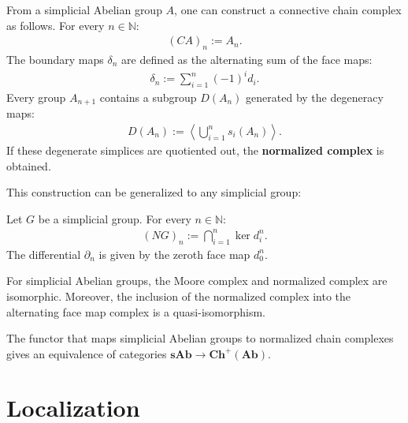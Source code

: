     \begin{construct}
        From a simplicial Abelian group $A$, one can construct a connective chain complex as follows. For every $n\in\mathbb{N}$:
        \begin{gather}
            (CA)_n := A_n.
        \end{gather}
        The boundary maps $\delta_n$ are defined as the alternating sum of the face maps:
        \begin{gather}
            \delta_n := \sum_{i=1}^n(-1)^id_i.
        \end{gather}
        Every group $A_{n+1}$ contains a subgroup $D(A_n)$ generated by the degeneracy maps:
        \begin{gather}
            D(A_n) := \left\langle\bigcup_{i=1}^ns_i(A_n)\right\rangle.
        \end{gather}
        If these degenerate simplices are quotiented out, the \textbf{normalized complex} is obtained.
    \end{construct}
    This construction can be generalized to any simplicial group:
    \begin{construct}
        Let $G$ be a simplicial group. For every $n\in\mathbb{N}$:
        \begin{gather}
            (NG)_n := \bigcap_{i=1}^n\ker d^n_i.
        \end{gather}
        The differential $\partial_n$ is given by the zeroth face map $d^n_0$.
    \end{construct}
    \begin{property}[Equivalences]
        For simplicial Abelian groups, the Moore complex and normalized complex are isomorphic. Moreover, the inclusion of the normalized complex into the alternating face map complex is a quasi-isomorphism.
    \end{property}

    \begin{theorem}\label{model:dold_kan}
        The functor that maps simplicial Abelian groups to normalized chain complexes gives an equivalence of categories $\mathbf{sAb}\rightarrow\mathbf{Ch}^+(\mathbf{Ab})$.
    \end{theorem}

\section{Localization}


